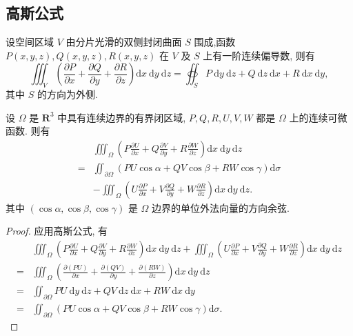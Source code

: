 \subsection{高斯公式}
\begin{theorem}[高斯公式]\label{thm:gauss}
设空间区域 $V$ 由分片光滑的双侧封闭曲面 $S$ 围成,函数 $P(x, y, z), Q(x, y, z), R(x, y, z)$ 在 $V$ 及 $S$ 上有一阶连续偏导数, 则有
$$
\iiint_V\left(\frac{\partial P}{\partial x}+\frac{\partial Q}{\partial y}+\frac{\partial R}{\partial z}\right) \mathrm{d} x \mathrm{~d} y \mathrm{~d} z=\oiint_S P \mathrm{~d} y \mathrm{~d} z+Q \mathrm{~d} z \mathrm{~d} x+R \mathrm{~d} x \mathrm{~d} y,
$$
其中 $S$ 的方向为外侧.
\end{theorem}
\begin{corollary}[三维分部积分公式]
    设 $\Omega$ 是 $\mathbf{R}^3$ 中具有连续边界的有界闭区域, $P, Q, R, U, V, W$ 都是 $\Omega$ 上的连续可微函数. 则有
$$
\begin{aligned}
& \iiint_{\Omega}\left(P \frac{\partial U}{\partial x}+Q \frac{\partial V}{\partial y}+R \frac{\partial W}{\partial z}\right) \mathrm{d} x \mathrm{~d} y \mathrm{~d} z\\
= & \iint_{\partial \Omega}(P U \cos \alpha+Q V \cos \beta+R W \cos \gamma) \mathrm{d} \sigma \\
& -\iiint_{\Omega}\left(U \frac{\partial P}{\partial x}+V \frac{\partial Q}{\partial y}+W \frac{\partial R}{\partial z}\right) \mathrm{d} x \mathrm{~d} y \mathrm{~d} z .
\end{aligned}
$$
其中 $(\cos \alpha, \cos \beta, \cos \gamma)$ 是 $\Omega$ 边界的单位外法向量的方向余弦.
\end{corollary}
\begin{proof}
    应用高斯公式, 有
    {
        \small
        \begin{align*}
            & \iiint_{\Omega}\left(P \frac{\partial U}{\partial x}+Q \frac{\partial V}{\partial y}+R \frac{\partial W}{\partial z}\right) \mathrm{d} x \mathrm{~d} y \mathrm{~d} z+\iiint_{\Omega}\left(U \frac{\partial P}{\partial x}+V \frac{\partial Q}{\partial y}+W \frac{\partial R}{\partial z}\right) \mathrm{d} x \mathrm{~d} y \mathrm{~d} z \\
            = & \iiint_{\Omega}\left(\frac{\partial(P U)}{\partial x}+\frac{\partial(Q V)}{\partial y}+\frac{\partial(R W)}{\partial z}\right) \mathrm{d} x \mathrm{~d} y \mathrm{~d} z \\
            = & \iint_{\partial \Omega} P U \mathrm{~d} y \mathrm{~d} z+Q V \mathrm{~d} z \mathrm{~d} x+R W \mathrm{~d} x \mathrm{~d} y \\
            = & \iint_{\partial \Omega}(P U \cos \alpha+Q V \cos \beta+R W \cos \gamma) \mathrm{d} \sigma .
        \end{align*}
    }
\end{proof}

